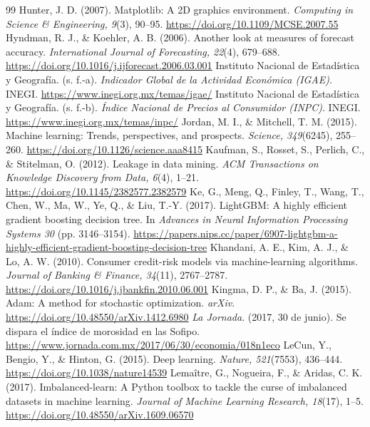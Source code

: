 \begin{thebibliography}{99}
 Hunter, J. D. (2007). Matplotlib: A 2D graphics environment. \textit{Computing in Science \& Engineering, 9}(3), 90--95. \url{https://doi.org/10.1109/MCSE.2007.55}
 Hyndman, R. J., \& Koehler, A. B. (2006). Another look at measures of forecast accuracy. \textit{International Journal of Forecasting, 22}(4), 679--688. \url{https://doi.org/10.1016/j.ijforecast.2006.03.001}
 Instituto Nacional de Estadística y Geografía. (s. f.-a). \textit{Indicador Global de la Actividad Económica (IGAE)}. INEGI. \url{https://www.inegi.org.mx/temas/igae/}%
 Instituto Nacional de Estadística y Geografía. (s. f.-b). \textit{Índice Nacional de Precios al Consumidor (INPC)}. INEGI. \url{https://www.inegi.org.mx/temas/inpc/}%
 Jordan, M. I., \& Mitchell, T. M. (2015). Machine learning: Trends, perspectives, and prospects. \textit{Science, 349}(6245), 255--260. \url{https://doi.org/10.1126/science.aaa8415}
 Kaufman, S., Rosset, S., Perlich, C., \& Stitelman, O. (2012). Leakage in data mining. \textit{ACM Transactions on Knowledge Discovery from Data, 6}(4), 1--21. \url{https://doi.org/10.1145/2382577.2382579}%
 Ke, G., Meng, Q., Finley, T., Wang, T., Chen, W., Ma, W., Ye, Q., \& Liu, T.-Y. (2017). LightGBM: A highly efficient gradient boosting decision tree. In \textit{Advances in Neural Information Processing Systems 30} (pp. 3146--3154). \url{https://papers.nips.cc/paper/6907-lightgbm-a-highly-efficient-gradient-boosting-decision-tree}%
 Khandani, A. E., Kim, A. J., \& Lo, A. W. (2010). Consumer credit-risk models via machine-learning algorithms. \textit{Journal of Banking \& Finance, 34}(11), 2767--2787. \url{https://doi.org/10.1016/j.jbankfin.2010.06.001}
 Kingma, D. P., \& Ba, J. (2015). Adam: A method for stochastic optimization. \textit{arXiv}. \url{https://doi.org/10.48550/arXiv.1412.6980}
 \textit{La Jornada}. (2017, 30 de junio). Se dispara el índice de morosidad en las Sofipo. \url{https://www.jornada.com.mx/2017/06/30/economia/018n1eco}
 LeCun, Y., Bengio, Y., \& Hinton, G. (2015). Deep learning. \textit{Nature, 521}(7553), 436--444. \url{https://doi.org/10.1038/nature14539}
 Lemaître, G., Nogueira, F., \& Aridas, C. K. (2017). Imbalanced-learn: A Python toolbox to tackle the curse of imbalanced datasets in machine learning. \textit{Journal of Machine Learning Research, 18}(17), 1--5. \url{https://doi.org/10.48550/arXiv.1609.06570}

\end{thebibliography}

